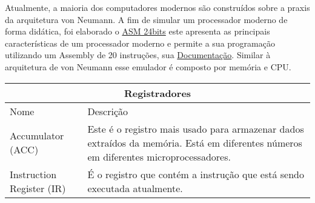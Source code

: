 Atualmente, a maioria dos computadores modernos são construídos sobre a praxis da arquitetura von Neumann. A fim de simular um processador moderno de forma didática, foi elaborado o \href{https://gzsig.io/vm-24bits/}{ASM 24bits} este apresenta as principais características de um processador moderno e permite a sua programação utilizando um Assembly de 20 instruções, sua \href{https://github.com/gzsig/Asm/blob/master/README.md}{Documentação}. Similar à arquitetura de von Neumann esse emulador é composto por memória e CPU.

\vspace{1cm}
\begin{tabular}{ |p{3cm}||p{9cm}|  }
  \hline
  \multicolumn{2}{|c|}{Registradores} \\
  \hline
    Nome &Descrição\\
  \hline
    Accumulator (ACC) &Este é o registro mais usado para armazenar dados extraídos da memória. Está em diferentes números em diferentes microprocessadores.\\
  \hline
    Instruction Register (IR) &É o registro que contém a instrução que está sendo executada atualmente.\\
  \hline
\end{tabular}

\newpage
